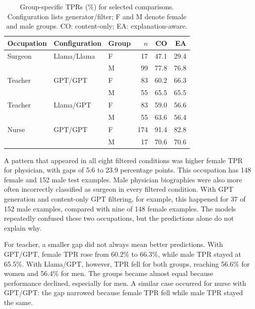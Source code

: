 \documentclass[sigconf]{acmart}
\begin{document}
\begin{table}[H]
    \centering
    \caption{Group-specific TPRs (\%) for selected comparisons. Configuration lists generator/filter; F and M denote female and male groups. CO: content-only; EA: explanation-aware.}
    \label{tab:occupation-examples}
    \small
    \setlength{\tabcolsep}{4pt}
    \begin{tabular}{lllrrr}
        \toprule
        Occupation & Configuration & Group & $n$ & CO & EA \\
        \midrule
        Surgeon & Llama/Llama & F & 17 & 47.1 & 29.4 \\
                &             & M & 99 & 77.8 & 76.8 \\
        \addlinespace
        Teacher & GPT/GPT & F & 83 & 60.2 & 66.3 \\
                &         & M & 55 & 65.5 & 65.5 \\
        \addlinespace
        Teacher & Llama/GPT & F & 83 & 59.0 & 56.6 \\
                &           & M & 55 & 63.6 & 56.4 \\
        \addlinespace
        Nurse & GPT/GPT & F & 174 & 91.4 & 82.8 \\
              &         & M & 17 & 70.6 & 70.6 \\
        \bottomrule
    \end{tabular}
\end{table}

A pattern that appeared in all eight filtered conditions was higher female TPR for physician, with gaps of 5.6 to 23.9 percentage points. This occupation has 148 female and 152 male test examples. Male physician biographies were also more often incorrectly classified as surgeon in every filtered condition. With GPT generation and content-only GPT filtering, for example, this happened for 37 of 152 male examples, compared with nine of 148 female examples. The models repeatedly confused these two occupations, but the predictions alone do not explain why.

For teacher, a smaller gap did not always mean better predictions. With GPT/GPT, female TPR rose from 60.2\% to 66.3\%, while male TPR stayed at 65.5\%. With Llama/GPT, however, TPR fell for both groups, reaching 56.6\% for women and 56.4\% for men. The groups became almost equal because performance declined, especially for men. A similar case occurred for nurse with GPT/GPT: the gap narrowed because female TPR fell while male TPR stayed the same.
\end{document}
